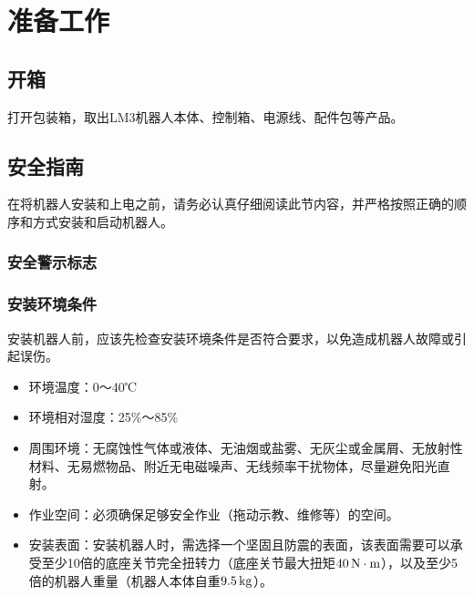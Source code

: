 \chapter{准备工作}
\section{开箱}
打开包装箱，取出LM3机器人本体、控制箱、电源线、配件包等产品。

\section{安全指南}
\label{sec:安全指南}
在将机器人安装和上电之前，请务必认真仔细阅读此节内容，并严格按照正确的顺序和方式安装和启动机器人。

\subsection{安全警示标志}




\subsection{安装环境条件}
安装机器人前，应该先检查安装环境条件是否符合要求，以免造成机器人故障或引起误伤。

\begin{itemize}
\item 环境温度：0～40℃
\item 环境相对湿度：25\%～85\%
\item 周围环境：无腐蚀性气体或液体、无油烟或盐雾、无灰尘或金属屑、无放射性材料、无易燃物品、附近无电磁噪声、无线频率干扰物体，尽量避免阳光直射。
\item 作业空间：必须确保足够安全作业（拖动示教、维修等）的空间。
\item 安装表面：安装机器人时，需选择一个坚固且防震的表面，该表面需要可以承受至少10倍的底座关节完全扭转力（底座关节最大扭矩$40 \,\mathrm{N\cdot m}$），以及至少5倍的机器人重量（机器人本体自重$9.5 \,\mathrm{kg}$）。
\end{itemize}

